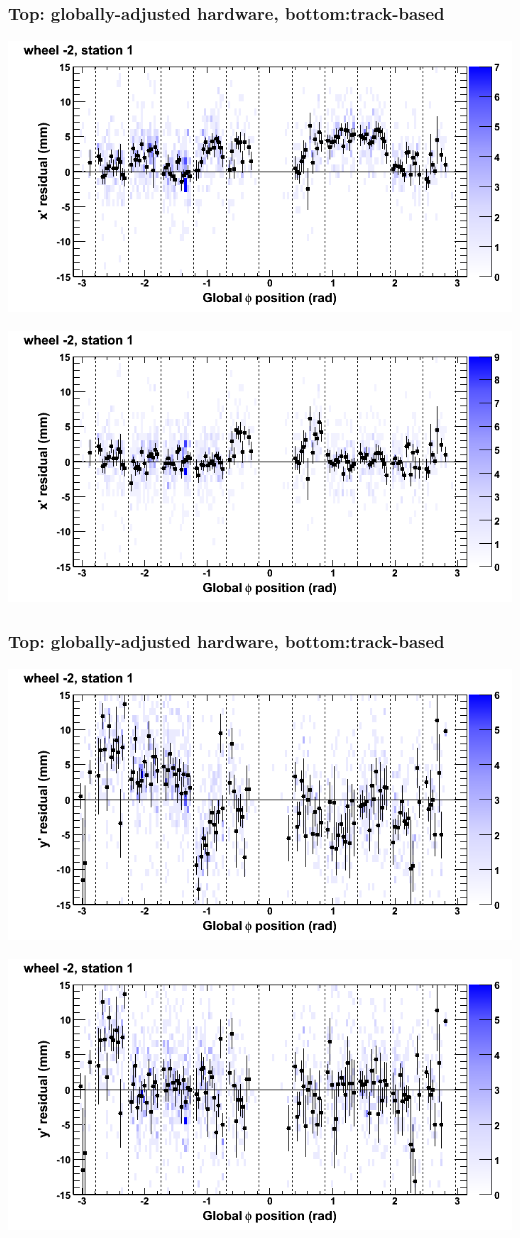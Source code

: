 \documentclass[compress]{beamer}
\begin{document}
\begin{frame}
\frametitle{Top: globally-adjusted hardware, bottom:track-based}
\includegraphics[width=0.7\linewidth]{NOV4_mapplots_HW/DTvsphi_st1whA_x.png}

\includegraphics[width=0.7\linewidth]{NOV4_mapplots/DTvsphi_st1whA_x.png}
\end{frame}

\begin{frame}
\frametitle{Top: globally-adjusted hardware, bottom:track-based}
\includegraphics[width=0.7\linewidth]{NOV4_mapplots_HW/DTvsphi_st1whA_y.png}

\includegraphics[width=0.7\linewidth]{NOV4_mapplots/DTvsphi_st1whA_y.png}
\end{frame}
\end{document}
